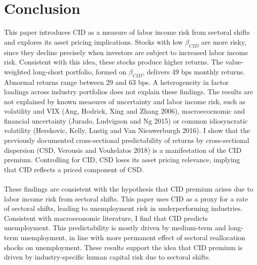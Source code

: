 \documentclass[12pt]{article}
\begin{document}
\vspace{1cm}

\section{Conclusion} \label{sec:Model}

This paper introduces CID as a measure of labor income risk from sectoral shifts and explores its asset pricing implications. Stocks with low $\beta_{CID}$ are more risky, since they decline precisely when investors are subject to increased labor income risk. Consistent with this idea, these stocks produce higher returns. The value-weighted long-short portfolio, formed on $\beta_{CID}$, delivers 49 bps monthly returns. Abnormal returns range between 29 and 63 bps. A heterogeneity in factor loadings across industry portfolios does not explain these findings. The results are not explained by known measures of uncertainty and labor income risk, such as volatility and VIX (Ang, Hodrick, Xing and Zhang 2006), macroecocnomic and financial uncertainty (Jurado, Ludvigson and Ng 2015) or common idiosyncratic volatility (Herskovic, Kelly, Lustig and Van Nieuwerburgh 2016). I show that the previously documented cross-sectional predictability of returns by cross-sectional dispersion (CSD, Verousis and Voukelatos 2018) is a manifestation of the CID premium. Controlling for CID, CSD loses its asset pricing relevance, implying that CID reflects a priced component of CSD.
\paragraph{}
These findings are consistent with the hypothesis that CID premium arises due to labor income risk from sectoral shifts. This paper uses CID as a proxy for a rate of sectoral shifts, leading to unemployment risk in underperforming industries. Consistent with macroeconomic literature, I find that CID predicts unemployment. This predictability is mostly driven by medium-term and long-term unemployment, in line with more permanent effect of sectoral reallocation shocks on unemployment. These results support the idea that CID premium is driven by industry-specific human capital risk due to sectoral shifts.


\newpage
\end{document}
